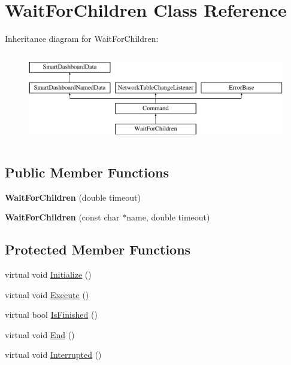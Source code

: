 \hypertarget{classWaitForChildren}{
\section{WaitForChildren Class Reference}
\label{classWaitForChildren}
}
Inheritance diagram for WaitForChildren:\begin{figure}[H]
\begin{center}
\leavevmode
\includegraphics[height=4.000000cm]{classWaitForChildren}
\end{center}
\end{figure}
\subsection*{Public Member Functions}
\begin{DoxyCompactItemize}
\item 
\hypertarget{classWaitForChildren_a0afac9cd2a6a3e60b336851128a9d038}{
{\bfseries WaitForChildren} (double timeout)}
\label{classWaitForChildren_a0afac9cd2a6a3e60b336851128a9d038}

\item 
\hypertarget{classWaitForChildren_a485570aaaf0d7105b7b9c222f7df9f3d}{
{\bfseries WaitForChildren} (const char $\ast$name, double timeout)}
\label{classWaitForChildren_a485570aaaf0d7105b7b9c222f7df9f3d}

\end{DoxyCompactItemize}
\subsection*{Protected Member Functions}
\begin{DoxyCompactItemize}
\item 
virtual void \hyperlink{classWaitForChildren_a1c66bfd3d5fd9d8896bee72abde428e8}{Initialize} ()
\item 
virtual void \hyperlink{classWaitForChildren_a0fa66dfbfc9d1add4cce927390bd3516}{Execute} ()
\item 
virtual bool \hyperlink{classWaitForChildren_a9aac8a80a26f41cfa1032b3d08bda332}{IsFinished} ()
\item 
virtual void \hyperlink{classWaitForChildren_a2e4795974df040aa4e93cae57f081bf4}{End} ()
\item 
virtual void \hyperlink{classWaitForChildren_a68a22a01292ce96d7413cba66d0da486}{Interrupted} ()
\end{DoxyCompactItemize}


